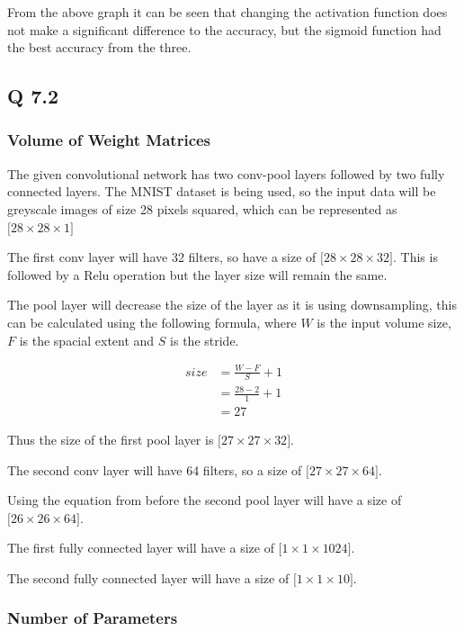 From the above graph it can be seen that changing the activation function does not make a significant difference to the accuracy, but the sigmoid function had the best accuracy from the three.

\subsection*{Q 7.2}

\subsubsection*{Volume of Weight Matrices}

The given convolutional network has two conv-pool layers followed by two fully connected layers.
The MNIST dataset is being used, so the input data will be greyscale images of size 28 pixels squared,
which can be represented as $\big[ 28 \times 28 \times 1 \big]$

The first conv layer will have 32 filters, so have a size of $\big [28 \times 28 \times 32 \big]$.
This is followed by a Relu operation but the layer size will remain the same.

The pool layer will decrease the size of the layer as it is using downsampling, this can be calculated using the following formula,
where $W$ is the input volume size, $F$ is the spacial extent and $S$ is the stride.

\begin{align*}
	size &= \frac{W - F}{S} + 1 \\
	&= \frac{28 - 2}{1} + 1\\
	&= 27
\end{align*}

Thus the size of the first pool layer is $\big[ 27 \times 27 \times 32 \big]$.

The second conv layer will have 64 filters, so a size of $\big [27 \times 27 \times 64 \big]$.

Using the equation from before the second pool layer will have a size of $\big [26 \times 26 \times 64 \big]$.

The first fully connected layer will have a size of $\big [1 \times 1 \times 1024 \big]$.

The second fully connected layer will have a size of $\big [1 \times 1 \times 10 \big]$.

\subsubsection*{Number of Parameters}

